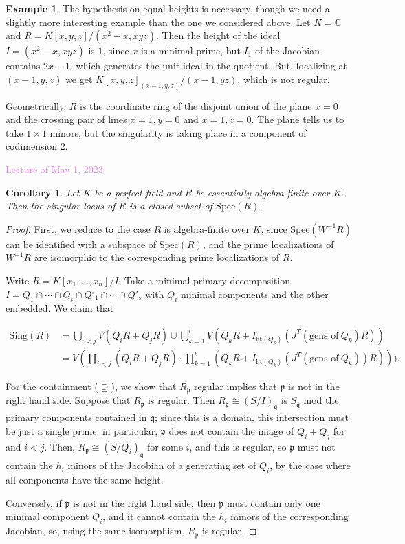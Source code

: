 \documentclass{amsart}[12pt]
\newcommand{\htt}{\mathrm{ht}}
\newcommand{\Spec}{\mathrm{Spec}}
\newcommand{\May}[1]{\textcolor{violet}{Lecture of May #1, 2023}}
\newcommand{\C}{\mathbb{C}}
\newcommand{\fp}{{\mathfrak p}}
\newcommand{\fq}{{\mathfrak q}}
\numberwithin{equation}{section}
\theoremstyle{plain} %
\newtheorem{cor}[equation]{Corollary}
\theoremstyle{definition}
\newtheorem{ex}[equation]{Example}
\theoremstyle{remark}
\begin{document}
\begin{ex} 
The hypothesis on equal heights is necessary, though we need a slightly more interesting example than the one we considered above. Let $K=\C$ and $R=K[x,y,z]/(x^2-x,xyz)$. Then the height of the ideal $I=(x^2-x,xyz)$ is $1$, since $x$ is a minimal prime, but $I_1$ of the Jacobian contains $2x-1$, which generates the unit ideal in the quotient. But, localizing at $(x-1,y,z)$ we get $K[x,y,z]_{(x-1,y,z)}/(x-1,yz)$, which is not regular. 

Geometrically, $R$ is the coordinate ring of the disjoint union of the plane $x=0$ and the crossing pair of lines $x=1, y=0$ and $x=1,z=0$. The plane tells us to take $1\times 1$ minors, but the singularity is taking place in a component of codimension 2.
\end{ex}


\May{1}

\begin{cor} Let $K$ be a perfect field and $R$ be essentially algebra finite over $K$. Then the singular locus of $R$ is a closed subset of $\Spec(R)$.
\end{cor}
\begin{proof} First, we reduce to the case $R$ is algebra-finite over $K$, since $\Spec(W^{-1}R)$ can be identified with a subspace of $\Spec(R)$, and the prime localizations of $W^{-1}R$ are isomorphic to the corresponding prime localizations of $R$.

Write $R=K[x_1,\dots,x_n]/I$. Take a minimal primary decomposition $I = Q_1 \cap \cdots \cap Q_t \cap Q'_{1} \cap \cdots \cap Q'_s$ with $Q_i$ minimal components and the other embedded. We claim that 

\[ \begin{aligned} \mathrm{Sing}(R) &= \bigcup_{i<j} V( Q_i R + Q_j R) \cup \bigcup_{k=1}^t V(Q_k R + I_{\htt(Q_k)}(J^T(\text{gens of} \ Q_k)R))\\&= V( \prod_{i<j} (Q_i R +Q_jR) \cdot \prod_{k=1}^t (Q_kR + I_{\htt(Q_k)}(J^T(\text{gens of} \ Q_k))R)) ). \end{aligned}\]

For the containment ($\supseteq$), we show that $R_\fp$ regular implies that $\fp$ is not in the right hand side. 
Suppose that $R_{\fp}$ is regular. Then $R_\fp \cong (S/I)_{\fq}$ is $S_{\fq}$ mod the primary components contained in $\fq$; since this is a domain, this intersection must be just a single prime; in particular, $\fp$ does not contain the image of $Q_i+Q_j$ for and $i<j$. Then, $R_\fp \cong (S/Q_i)_{\fq}$ for some $i$, and this is regular, so $\fp$ must not contain the $h_i$ minors of the Jacobian of a generating set of $Q_i$, by the case where all components have the same height. 

 Conversely, if $\fp$ is not in the right hand side, then $\fp$ must contain only one minimal component $Q_i$, and it cannot contain the $h_i$ minors of the corresponding Jacobian, so, using the same isomorphism, $R_{\fp}$ is regular.
\end{proof}
\end{document}
